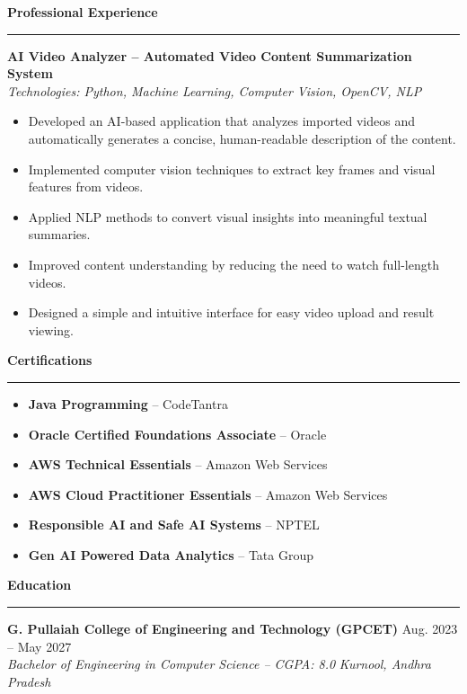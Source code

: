 \documentclass[letterpaper,11pt]{article}
\newcommand{\sectionrule}{%
  \vspace{1pt}%
  \noindent\rule{\linewidth}{0.7pt}%
  \vspace{1pt}%
}
\newcommand{\resumesection}[1]{%
  \vspace{4pt}%
  {\large\textbf{#1}}%
  \sectionrule%
}
\begin{document}
\resumesection{Professional Experience}
\vspace{1pt}
\noindent\textbf{AI Video Analyzer -- Automated Video Content Summarization System}\\
\textit{Technologies: Python, Machine Learning, Computer Vision, OpenCV, NLP}
\begin{itemize}[leftmargin=0.18in, topsep=1pt, itemsep=0pt, parsep=0pt]
  \item[\small\textbullet] \small Developed an AI-based application that analyzes imported videos and automatically generates a concise, human-readable description of the content.
  \item[\small\textbullet] \small Implemented computer vision techniques to extract key frames and visual features from videos.
  \item[\small\textbullet] \small Applied NLP methods to convert visual insights into meaningful textual summaries.
  \item[\small\textbullet] \small Improved content understanding by reducing the need to watch full-length videos.
  \item[\small\textbullet] \small Designed a simple and intuitive interface for easy video upload and result viewing.
\end{itemize}

\vspace{-3pt}
\resumesection{Certifications}
\vspace{1pt}
\begin{itemize}[leftmargin=0.18in, topsep=0pt, itemsep=0pt, parsep=0pt]
  \item[\small\textbullet] \small \textbf{Java Programming} -- CodeTantra
  \item[\small\textbullet] \small \textbf{Oracle Certified Foundations Associate} -- Oracle
  \item[\small\textbullet] \small \textbf{AWS Technical Essentials} -- Amazon Web Services
  \item[\small\textbullet] \small \textbf{AWS Cloud Practitioner Essentials} -- Amazon Web Services
  \item[\small\textbullet] \small \textbf{Responsible AI and Safe AI Systems} -- NPTEL
  \item[\small\textbullet] \small \textbf{Gen AI Powered Data Analytics} -- Tata Group
\end{itemize}

\resumesection{Education}
\vspace{1pt}
\noindent\textbf{G. Pullaiah College of Engineering and Technology (GPCET)} \hfill Aug. 2023 -- May 2027\\
\textit{Bachelor of Engineering in Computer Science -- CGPA: 8.0} \hfill \textit{Kurnool, Andhra Pradesh}
\end{document}
